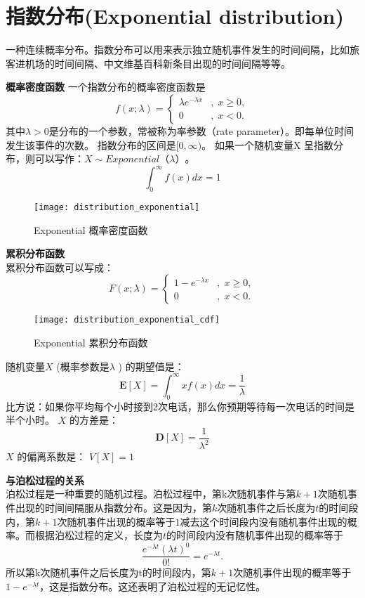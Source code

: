 \documentclass[openany]{book}
\begin{document}
\section{指数分布(Exponential distribution)}
\label{sec.distribution.exponential}
一种连续概率分布。指数分布可以用来表示独立随机事件发生的时间间隔，比如旅客进机场的时间间隔、中文维基百科新条目出现的时间间隔等等。

\textbf{概率密度函数}
一个指数分布的概率密度函数是
$$f(x;\lambda )=\left\{{\begin{matrix}\lambda e^{{-\lambda x}}&,\;x\geq 0,\\0&,\;x<0.\end{matrix}}\right.$$
其中$\lambda  > 0$是分布的一个参数，常被称为率参数（rate parameter）。即每单位时间发生该事件的次数。
指数分布的区间是$[0,\infty)$。 如果一个随机变量X 呈指数分布，则可以写作：$X \sim Exponential（\lambda ）$。
$$
\int_0^{\infty} f(x)dx = 1
$$
\begin{figure}[htbp]
  \centering
  \texttt{[image: distribution\_exponential]}\\
  \caption{Exponential 概率密度函数}\label{fig.distribution.exponential}
\end{figure}
	
\textbf{累积分布函数}\\
累积分布函数可以写成：
$$F(x;\lambda )=\left\{{\begin{matrix}1-e^{{-\lambda x}}&,\;x\geq 0,\\0&,\;x<0.\end{matrix}}\right.$$
\begin{figure}[htbp]
  \centering
  \texttt{[image: distribution\_exponential\_cdf]}\\
  \caption{Exponential 累积分布函数}\label{fig.distribution.exponential.cdf}
\end{figure}
	
随机变量$X$ (概率参数是$\lambda$ ) 的期望值是：
$$
{\mathbf  {E}}[X]=\int_0^{\infty} xf(x)dx = {\frac  {1}{\lambda }}
$$
比方说：如果你平均每个小时接到2次电话，那么你预期等待每一次电话的时间是半个小时。
$X$ 的方差是：
$${\mathbf  {D}}[X]={\frac{1}{\lambda ^{2}}}
$$
$X$ 的偏离系数是： $V[X] = 1$

\textbf{与泊松过程的关系}\\
泊松过程是一种重要的随机过程。泊松过程中，第k次随机事件与第$k+1$次随机事件出现的时间间隔服从指数分布。这是因为，第$k$次随机事件之后长度为$t$的时间段内，第$k+1$次随机事件出现的概率等于$1$减去这个时间段内没有随机事件出现的概率。而根据泊松过程的定义，长度为$t$的时间段内没有随机事件出现的概率等于
$$
{\frac  {e^{{-\lambda t}}(\lambda t)^{0}}{0!}}=e^{{-\lambda t}}.
$$
所以第k次随机事件之后长度为t的时间段内，第$k+1$次随机事件出现的概率等于$1-e^{{-\lambda t}}$，这是指数分布。这还表明了泊松过程的无记忆性。
\end{document}
